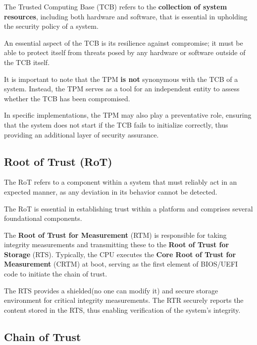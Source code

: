 \begin{boxH}
The Trusted Computing Base (TCB) refers to the \textbf{collection of
system resources}, including both hardware and software, that is
essential in upholding the security policy of a system. 
\end{boxH}

An essential aspect of the TCB is its resilience against compromise;
it must be able to protect itself from threats posed by any hardware
or software outside of the TCB itself.

It is important to note that the TPM \textbf{is not} synonymous with
the TCB of a system. Instead, the TPM serves as a tool for an
independent entity to assess whether the TCB has been compromised. 

In specific implementations, the TPM may also play a preventative
role, ensuring that the system does not start if the TCB fails to
initialize correctly, thus providing an additional layer of security
assurance.

\subsection{Root of Trust (RoT)}

\begin{boxH}
  The RoT refers to a component within a system that must reliably act
  in an expected manner, as any deviation in its behavior cannot be
  detected. 
\end{boxH}

The RoT is essential in establishing trust within a platform
and comprises several foundational components.

The \textbf{Root of Trust for Measurement} (RTM) is responsible for 
taking integrity measurements and transmitting these to the 
\textbf{Root of Trust for Storage} (RTS). Typically, the CPU executes 
the \textbf{Core Root of Trust for Measurement} (CRTM) at boot, 
serving as the first element of BIOS/UEFI code to initiate the 
chain of trust.

The RTS provides a shielded(no one can modify it) and secure storage
environment for critical integrity measurements.
The RTR securely reports the content stored in the RTS, thus enabling
verification of the system's integrity.

\subsection{Chain of Trust}

